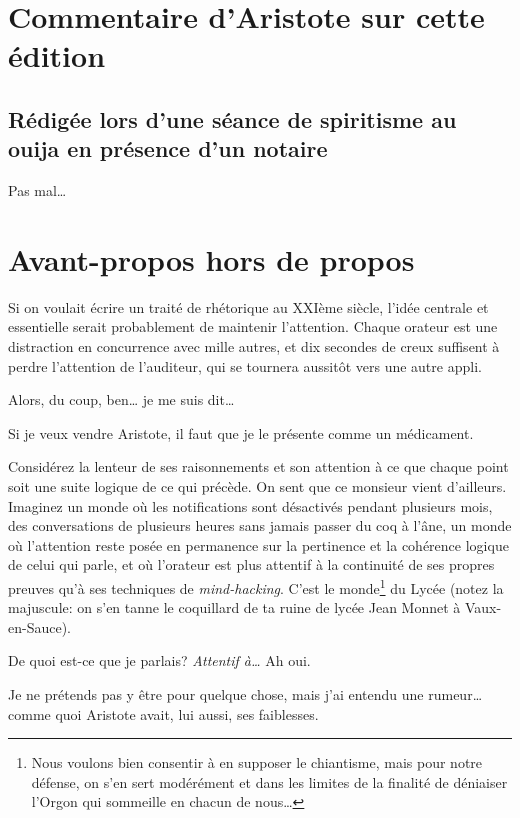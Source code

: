 
\tableofcontents

\newpage

\section*{Commentaire d'Aristote sur cette édition}
\subsection*{Rédigée lors d'une séance de spiritisme au ouija en présence d'un notaire}

Pas mal\dots{}

\newpage

\section*{Avant-propos hors de propos}

Si on voulait écrire un traité de rhétorique au XXIème siècle, l'idée centrale et essentielle serait
probablement de maintenir l'attention. Chaque orateur est une distraction en concurrence avec mille
autres, et dix secondes de creux suffisent à perdre l'attention de l'auditeur, qui se tournera aussitôt
vers une autre appli. 

Alors, du coup, ben\dots{} je me suis dit\dots{}

Si je veux vendre Aristote, il faut que je le présente comme un médicament. 

Considérez la lenteur de ses raisonnements et son attention à ce que chaque point soit une suite logique
de ce qui précède. On sent que ce monsieur vient d'ailleurs. Imaginez un monde où les notifications sont
désactivés pendant plusieurs mois, des conversations de plusieurs heures sans jamais passer du coq à l’âne,
un monde où l'attention reste posée en permanence sur la pertinence et la cohérence logique de celui qui
parle, et où l'orateur est plus attentif à la continuité de ses propres preuves qu'à ses techniques de
\emph{mind-hacking}. C'est le monde\footnote{Nous voulons bien consentir à en supposer le chiantisme, mais
pour notre défense, on s'en sert modérément et dans les limites de la finalité de déniaiser l'Orgon qui
sommeille en chacun de nous\dots{}} du Lycée (notez la majuscule: on s'en tanne le coquillard de ta ruine
de lycée Jean Monnet à Vaux-en-Sauce).

De quoi est-ce que je parlais? \emph{Attentif à\dots} Ah oui.

Je ne prétends pas y être pour quelque chose, mais j'ai entendu une rumeur\dots{} comme quoi Aristote avait,
lui aussi, ses faiblesses.

